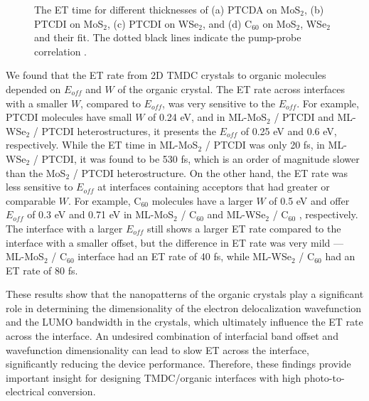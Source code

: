 \documentclass[12pt]{article}
\begin{document}
\begin{figure}[H]
\caption{The ET time for different thicknesses of (a) PTCDA on MoS$_2$, (b) PTCDI on MoS$_2$, (c) PTCDI on WSe$_2$, and (d) C$_{60}$ on MoS$_2$, WSe$_2$ and their fit. The dotted black lines indicate the pump-probe correlation \cite{rijal2020collective}.}\label{fig:CT rate fitting}
\end{figure}

We found that the ET rate from 2D TMDC crystals to organic molecules depended on $E_{off}$ and $W$ of the organic crystal. The ET rate across interfaces with a smaller $W$, compared to $E_{off}$, was very sensitive to the $E_{off}$. For example, PTCDI molecules have small $W$ of  0.24 eV, and in ML-MoS$_2$ / PTCDI and ML-WSe$_2$ / PTCDI heterostructures, it presents the $E_{off}$ of 0.25 eV and 0.6 eV, respectively. While the ET time in ML-MoS$_2$ / PTCDI was only 20 fs, in ML-WSe$_2$ / PTCDI, it was found to be 530 fs, which is an order of magnitude slower than the MoS$_2$ / PTCDI heterostructure. On the other hand, the ET rate was less sensitive to $E_{off}$ at interfaces containing acceptors that had greater or comparable $W$. For example, C$_{60}$ molecules have a larger $W$ of 0.5 eV and offer $E_{off}$ of 0.3 eV and 0.71 eV in ML-MoS$_2$ / C$_{60}$ and ML-WSe$_2$ / C$_{60}$ , respectively. The interface with a larger $E_{off}$ still shows a larger ET rate compared to the interface with a smaller offset, but the difference in ET rate was very mild --- ML-MoS$_2$ / C$_{60}$ interface had an ET rate of 40 fs, while ML-WSe$_2$ / C$_{60}$ had an ET rate of 80 fs. 
\vspace{7pt}

These results show that the nanopatterns of the organic crystals play a significant role in determining the dimensionality of the electron delocalization wavefunction and the LUMO bandwidth in the crystals, which ultimately influence the ET rate across the interface. An undesired combination of interfacial band offset and wavefunction dimensionality can lead to slow ET across the interface, significantly reducing the device performance. Therefore, these findings provide important insight for designing TMDC/organic interfaces with high photo-to-electrical conversion.
\end{document}
